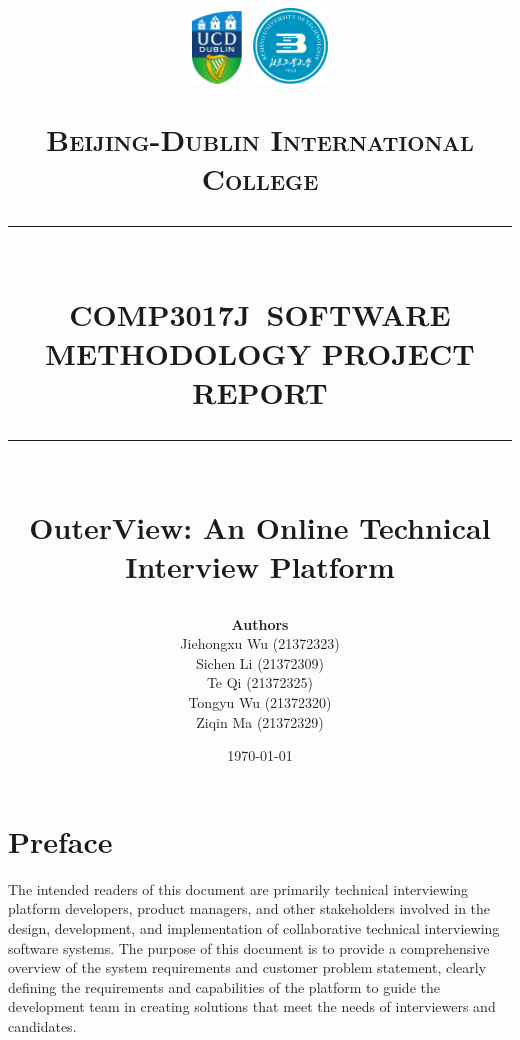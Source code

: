 \documentclass{article}
\newcommand{\coursecode}{COMP3017J}
\newcommand{\paperdate}{\today}
\newcommand{\HRule}[1]{\rule{\linewidth}{#1}}
\begin{document}

\title{ \normalsize  \includegraphics[width=0.1\textwidth]{images/UCD_Logo.pdf} \textbf{ }
\includegraphics[width=0.15\textwidth]{images/BJUT_Logo.pdf} \par \textsc{Beijing-Dublin International College}
		\\ [2.0cm]
		\HRule{1.5pt} \\ [0.35cm]
		\LARGE \textbf{\uppercase{\coursecode \ Software Methodology Project Report}}
		\HRule{1.5pt} \\ [0.9cm] \textbf{\LARGE{OuterView: An Online Technical Interview Platform}} \vspace*{6\baselineskip}
		}
\date{\paperdate}
\author{\textbf{Authors} \\ 
  Jiehongxu Wu (21372323) \\
  Sichen Li (21372309) \\
  Te Qi (21372325) \\
  Tongyu Wu (21372320) \\
  Ziqin Ma (21372329)
}

\maketitle
\newpage

\tableofcontents
\newpage


\section{Preface}

The intended readers of this document are primarily technical interviewing platform developers, 
product managers, and other stakeholders involved in the design, development, and implementation 
of collaborative technical interviewing software systems. The purpose of this document is to 
provide a comprehensive overview of the system requirements and customer problem statement, 
clearly defining the requirements and capabilities of the platform to guide the development team 
in creating solutions that meet the needs of interviewers and candidates.
\end{document}
